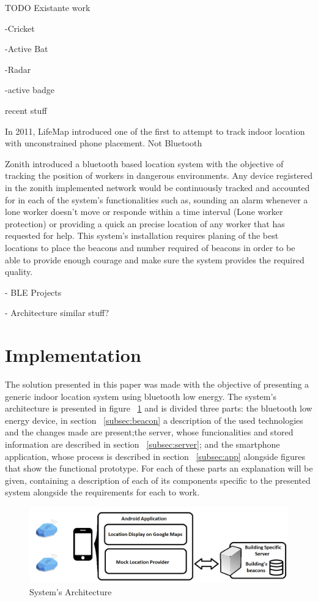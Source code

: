 \documentclass[a4paper]{IEEEtran}
\begin{document}
TODO Existante work

-Cricket


-Active Bat


-Radar


-active badge


recent stuff


In 2011, LifeMap \cite{lifemap} introduced one of the first to attempt to track indoor location with unconstrained phone placement. Not Bluetooth



Zonith \cite{zonith} introduced a bluetooth based location system with the objective of tracking the position of workers in dangerous environments. Any device registered in the zonith implemented network would be continuously tracked and accounted for in each of the system's functionalities such as, sounding an alarm whenever a lone worker doesn't move or responde within a time interval (Lone worker protection) or providing a quick an precise location of any worker that has requested for help. This system's installation requires planing of the best locations to place the beacons and number required of beacons in order to be able to provide enough courage and make sure the system provides the required quality.


- BLE Projects
	

- Architecture similar stuff?


\section{Implementation}
\label{sec:struture}


The solution presented in this paper was made with the objective of presenting a generic indoor location system using bluetooth low energy. The system's architecture is presented in figure ~\ref{fig:architecture} and is divided three parts: the bluetooth low energy device, in section ~\ref{subsec:beacon} a description of the used technologies and the changes made are present;the server, whose funcionalities and stored information are described in section ~\ref{subsec:server}; and the smartphone application, whose process is described in section ~\ref{subsec:app} alongside figures that show the functional prototype. For each of these parts an explanation will be given, containing a description of each of its components specific to the presented system alongside the requirements for each to work.

\begin{figure}
	\centering
		\includegraphics[width=1\linewidth]{figures/Architecture.png}
	\caption[System's Architecture]{System's Architecture}
	\label{fig:architecture}
\end{figure}
\end{document}
